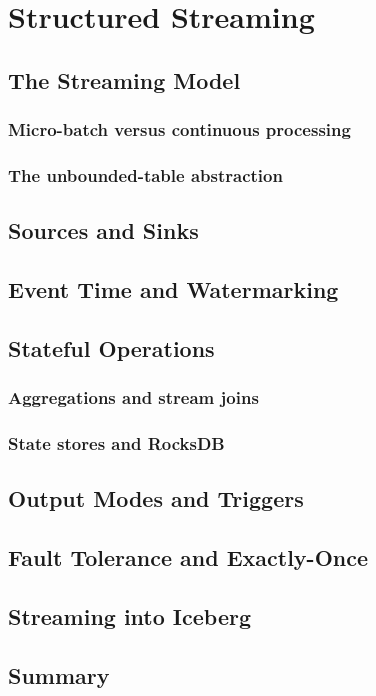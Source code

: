 \chapter{Structured Streaming}
\label{ch:streaming}

\tbd


\section{The Streaming Model}
\label{sec:str-model}

\subsection{Micro-batch versus continuous processing}
\tbd

\subsection{The unbounded-table abstraction}
\tbd

\section{Sources and Sinks}
\label{sec:str-io}
\tbd

\section{Event Time and Watermarking}
\label{sec:str-watermark}
\tbd

\section{Stateful Operations}
\label{sec:str-state}

\subsection{Aggregations and stream joins}
\tbd

\subsection{State stores and RocksDB}
\tbd

\section{Output Modes and Triggers}
\label{sec:str-output}
\tbd

\section{Fault Tolerance and Exactly-Once}
\label{sec:str-delivery}
\tbd

\section{Streaming into Iceberg}
\label{sec:str-iceberg}
\tbd

\section{Summary}
\tbd
